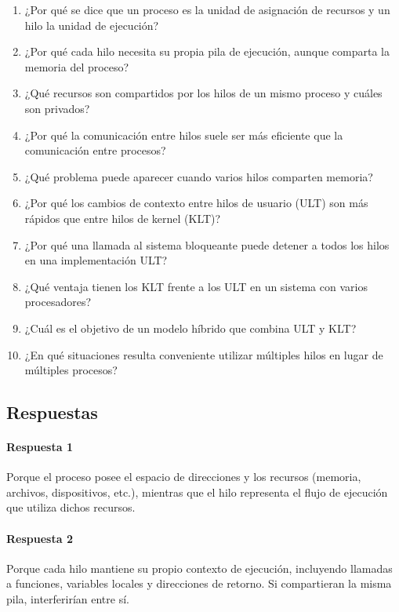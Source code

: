 \begin{enumerate}
  \item ¿Por qué se dice que un proceso es la unidad de asignación de recursos y un hilo la unidad de ejecución?
  \item ¿Por qué cada hilo necesita su propia pila de ejecución, aunque comparta la memoria del proceso?
  \item ¿Qué recursos son compartidos por los hilos de un mismo proceso y cuáles son privados?
  \item ¿Por qué la comunicación entre hilos suele ser más eficiente que la comunicación entre procesos?
  \item ¿Qué problema puede aparecer cuando varios hilos comparten memoria?
  \item ¿Por qué los cambios de contexto entre hilos de usuario (ULT) son más rápidos que entre hilos de kernel (KLT)?
  \item ¿Por qué una llamada al sistema bloqueante puede detener a todos los hilos en una implementación ULT?
  \item ¿Qué ventaja tienen los KLT frente a los ULT en un sistema con varios procesadores?
  \item ¿Cuál es el objetivo de un modelo híbrido que combina ULT y KLT?
  \item ¿En qué situaciones resulta conveniente utilizar múltiples hilos en lugar de múltiples procesos?
\end{enumerate}

\subsection*{Respuestas}

\paragraph{Respuesta 1} Porque el proceso posee el espacio de direcciones y los recursos (memoria, archivos, dispositivos, etc.), mientras que el hilo representa el flujo de ejecución que utiliza dichos recursos.

\paragraph{Respuesta 2} Porque cada hilo mantiene su propio contexto de ejecución, incluyendo llamadas a funciones, variables locales y direcciones de retorno. Si compartieran la misma pila, interferirían entre sí.

